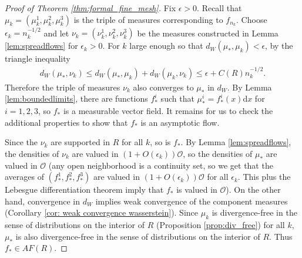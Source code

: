 \documentclass[11pt]{article}
\theoremstyle{remark}
\theoremstyle{definition}
\newcommand{\dd}{\mathrm{d}}
\begin{document}
\begin{proof}[Proof of Theorem \ref{thm:formal_fine_mesh}] Fix $\epsilon>0$. Recall that $\mu_k = (\mu_k^1,\mu_k^2, \mu_k^3)$ is the triple of measures corresponding to $f_{{n_k}}$. Choose $\epsilon_k =  n_k^{-1/2}$ and let $\nu_k = (\nu_k^1,\nu_k^2, \nu_k^3)$ be the measures constructed in Lemma \ref{lem:spreadflows} for $\epsilon_k>0$. For $k$ large enough so that $d_W(\mu_*,\mu_k)<\epsilon$, by the triangle inequality
\begin{align*}
    d_W(\mu_*, \nu_k) \leq d_W(\mu_*,\mu_k) + d_W(\mu_k, \nu_k) \leq \epsilon + C(R) n_k^{-1/2}.
\end{align*}
Therefore the triple of measures $\nu_k$ also converges to $\mu_*$ in $d_W$. By Lemma \ref{lem:boundedlimits}, there are functions $f_*^i$ such that  $\mu_*^i = f_*^i(x) \dd x$ for $i=1,2,3$, so $f_*$ is a measurable vector field. It remains for us to check the additional properties to show that $f_*$ is an asymptotic flow. 

Since the $\nu_k$ are supported in $R$ for all $k$, so is $f_*$. By Lemma \ref{lem:spreadflows}, the densities of $\nu_k$ are valued in $(1+ O(\epsilon_k)) \mathcal{O}$, so the densities of $\mu_*$ are valued in $\mathcal{O}$ (any open neighborhood is a continuity set, so we get that the averages of $(f_*^1,f_*^2,f_*^3)$ are valued in $(1+ O(\epsilon_k)) \mathcal{O}$ for all $\epsilon_k$. This plus the Lebesgue differentiation theorem imply that $f_*$ is valued in $\mathcal{O}$). On the other hand, convergence in $d_W$ implies weak convergence of the component measures (Corollary \ref{cor: weak convergence wasserstein}). Since $\mu_k$ is divergence-free in the sense of distributions on the interior of $R$ (Proposition \ref{prop:div_free}) for all $k$, $\mu_*$ is also divergence-free in the sense of distributions on the interior of $R$. Thus $f_*\in AF(R)$.
\end{proof}
\end{document}
